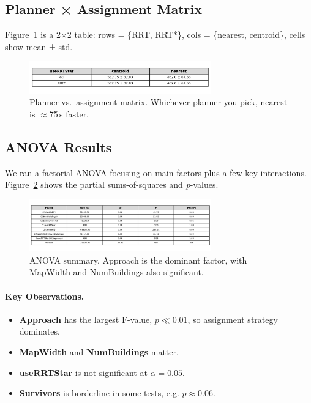 \documentclass[12pt,a4paper]{report}
\begin{document}
\subsection{Planner × Assignment Matrix}
Figure~\ref{fig:planner_approach} is a 2×2 table:  
rows = \{RRT, RRT*\}, cols = \{nearest, centroid\},  
cells show mean ± std.  
\begin{figure}[H]
\centering
\includegraphics[width=0.7\textwidth]{analysis/planner_x_approach.png}
\caption{Planner vs.\ assignment matrix. Whichever planner you pick, nearest is \(\approx\)75\,s faster.}
\label{fig:planner_approach}
\end{figure}


\subsection{ANOVA Results}
We ran a factorial ANOVA focusing on main factors plus a few key interactions. 
Figure~\ref{fig:anovares} shows the partial sums-of-squares and \emph{p}-values.  
\begin{figure}[H]
\centering
\includegraphics[width=0.7\textwidth]{analysis/anova_results.png}
\caption{ANOVA summary. Approach is the dominant factor, with MapWidth and NumBuildings also significant.}
\label{fig:anovares}
\end{figure}

\paragraph{Key Observations.}
\begin{itemize}
    \item \textbf{Approach} has the largest F-value, $p \ll 0.01$, so assignment strategy dominates. 
    \item \textbf{MapWidth} and \textbf{NumBuildings} matter.  
    \item \textbf{useRRTStar} is not significant at $\alpha=0.05$. 
    \item \textbf{Survivors} is borderline in some tests, e.g. $p \approx 0.06$.
\end{itemize}
\end{document}
